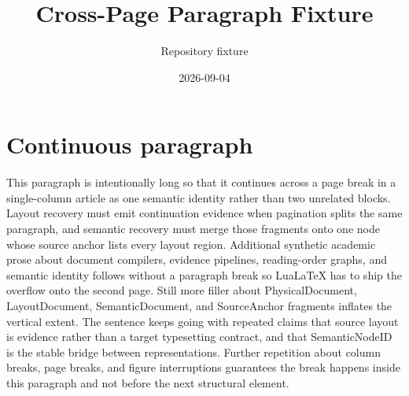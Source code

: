 \documentclass[11pt]{article}
\title{Cross-Page Paragraph Fixture}
\author{Repository fixture}
\date{2026-09-04}%
\begin{document}
\maketitle

\section{Continuous paragraph}
This paragraph is intentionally long so that it continues across a page
break in a single-column article as one semantic identity rather than
two unrelated blocks. Layout recovery must emit continuation evidence
when pagination splits the same paragraph, and semantic recovery must
merge those fragments onto one node whose source anchor lists every
layout region. Additional synthetic academic prose about document
compilers, evidence pipelines, reading-order graphs, and semantic
identity follows without a paragraph break so LuaLaTeX has to ship the
overflow onto the second page. Still more filler about PhysicalDocument,
LayoutDocument, SemanticDocument, and SourceAnchor fragments inflates
the vertical extent. The sentence keeps going with repeated claims that
source layout is evidence rather than a target typesetting contract,
and that SemanticNodeID is the stable bridge between representations.
Further repetition about column breaks, page breaks, and figure
interruptions guarantees the break happens inside this paragraph and
not before the next structural element.
\end{document}

